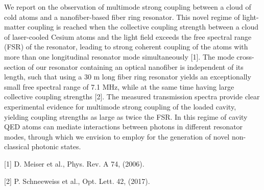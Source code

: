 \documentclass{scdpg}
\begin{document}
\begin{scAbstract}
\scNoUseTeX
{}
\scBeginText
We report on the observation of multimode strong coupling between a cloud of cold atoms and a nanofiber-based fiber ring resonator.
This novel regime of light-matter coupling is reached when the collective coupling strength between a cloud of laser-cooled Cesium atoms and the light field exceeds the free spectral range (FSR) of the resonator, leading to strong coherent coupling of the atoms with more than one longitudinal resonator mode simultaneously [1].
The mode cross-section of our resonator containing an optical nanofiber is independent of its length, such that using a 30 m long fiber ring resonator yields an exceptionally small free spectral range of 7.1 MHz, while at the same time having large collective coupling strengths [2].
The measured transmission spectra provide clear experimental evidence for multimode strong coupling of the loaded cavity, yielding coupling strengths as large as twice the FSR.
In this regime of cavity QED atoms can mediate interactions between photons in different resonator modes, through which we envision to employ for the generation of novel non-classical photonic states.

[1] D. Meiser et al., Phys. Rev. A 74, (2006).

[2]  P. Schneeweiss et al., Opt. Lett. 42, (2017).
\scEndText
{}
\end{scAbstract}
\end{document}
